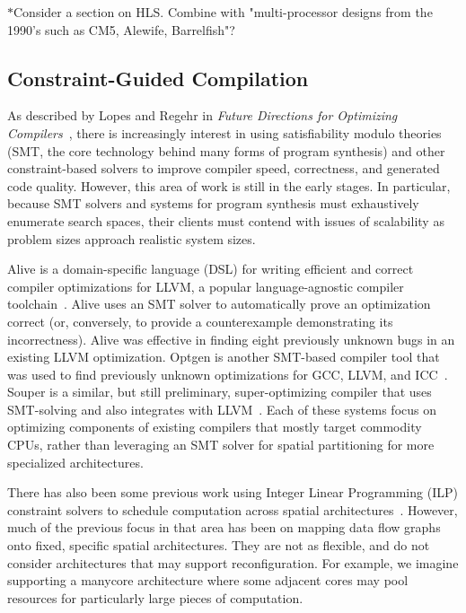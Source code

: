 \documentclass{sig-alternate-05-2015}
\newcommand{\note}{\color{red}$*$}
\begin{document}
{\note Consider a section on HLS. Combine with "multi-processor designs from the 1990’s such as CM5, Alewife, Barrelfish"?}

\subsection{Constraint-Guided Compilation}
As described by Lopes and Regehr in \emph{Future Directions for Optimizing Compilers}~\cite{future}, there is increasingly interest in using satisfiability modulo theories (SMT, the core technology behind many forms of program synthesis) and other constraint-based solvers to improve compiler speed, correctness, and generated code quality. However, this area of work is still in the early stages. In particular, because SMT solvers and systems for program synthesis must exhaustively enumerate search spaces, their clients must contend with issues of scalability as problem sizes approach realistic system sizes. 

Alive is a domain-specific language (DSL) for writing efficient and correct compiler optimizations for LLVM, a popular language-agnostic compiler toolchain~\cite{alive}. Alive uses an SMT solver to automatically prove an optimization correct (or, conversely, to provide a counterexample demonstrating its incorrectness). Alive was effective in finding eight previously unknown bugs in an existing LLVM optimization. Optgen is another SMT-based compiler tool that was used to find previously unknown optimizations for GCC, LLVM, and ICC~\cite{optgen}. Souper is a similar, but still preliminary, super-optimizing compiler that uses SMT-solving and also integrates with LLVM~\cite{souper}. Each of these systems focus on optimizing components of existing compilers that mostly target commodity CPUs, rather than leveraging an SMT solver for spatial partitioning for more specialized architectures.

There has also been some previous work using Integer Linear Programming (ILP) constraint solvers to schedule computation across spatial architectures~\cite{ilp}. However, much of the previous focus in that area has been on mapping data flow graphs onto fixed, specific spatial architectures. They are not as flexible, and do not consider architectures that may support reconfiguration. For example, we imagine supporting a manycore architecture where some adjacent cores may pool resources for particularly large pieces of computation. 
\end{document}
